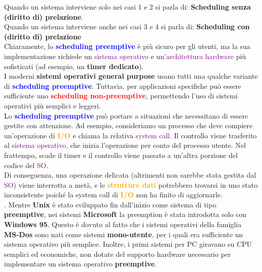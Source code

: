 Quando un sistema interviene solo nei casi 1 e 2 si parla di: \textbf{Scheduling senza (diritto di) prelazione}.\\
Quando un sistema interviene anche nei casi 3 e 4 si parla di: \textbf{Scheduling con (diritto di) prelazione}\\
Chiaramente, lo \textcolor{blue}{\textbf{scheduling preemptive}} è più sicuro per gli utenti, ma la sua implementazione richiede un \textcolor{purple}{sistema operativo} e un’\textcolor{purple}{architettura hardware} più sofisticati (ad esempio, un \textbf{timer dedicato}).\\
I moderni \textbf{sistemi operativi general purpose} usano tutti una qualche variante di \textcolor{blue}{\textbf{scheduling preemptive}}. Tuttavia, per applicazioni specifiche può essere sufficiente uno \textcolor{red}{\textbf{scheduling non-preemptive}}, permettendo l'uso di sistemi operativi più semplici e leggeri.\\
Lo \textcolor{blue}{\textbf{scheduling preemptive}} può portare a situazioni che necessitano di essere gestite con attenzione. Ad esempio, consideriamo un processo che deve compiere un’operazione di \textcolor{orange}{\textbf{I/O}} e chiama la relativa \textcolor{purple}{system call}. Il controllo viene trasferito al \textcolor{purple}{sistema operativo}, che inizia l’operazione per conto del processo utente. Nel frattempo, scade il timer e il controllo viene passato a un'altra porzione del codice del \textcolor{purple}{SO}.\\
Di conseguenza, una operazione delicata (altrimenti non sarebbe stata gestita dal \textcolor{purple}{SO}) viene interrotta a metà, e le \textcolor{orange}{\textbf{strutture dati}} potrebbero trovarsi in uno stato inconsistente poiché la system call di \textcolor{orange}{\textbf{I/O}} non ha finito di aggiornarle.\\
.
Mentre \textbf{Unix} è stato sviluppato fin dall’inizio come sistema di tipo {\textbf{preemptive}}, nei sistemi \textbf{Microsoft} la preemption è stata introdotta solo con \textbf{Windows 95}. Questo è dovuto al fatto che i sistemi operativi della famiglia \textbf{MS-Dos} sono nati come sistemi {\textbf{mono-utente}}, per i quali era sufficiente un sistema operativo più semplice. Inoltre, i primi sistemi per PC giravano su {CPU} semplici ed economiche, non dotate del supporto hardware necessario per implementare un sistema operativo {\textbf{preemptive}}.\\

